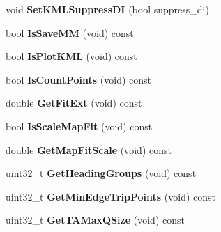 \begin{DoxyCompactItemize}
\item 
void {\bfseries Set\+K\+M\+L\+Suppress\+DI} (bool suppress\+\_\+di)\hypertarget{classconfig_1_1Config_aa4e6f2f9778ba96c67c061aca546a6d0}{}\label{classconfig_1_1Config_aa4e6f2f9778ba96c67c061aca546a6d0}

\item 
bool {\bfseries Is\+Save\+MM} (void) const \hypertarget{classconfig_1_1Config_a0c711135102e48e4b772d14514f03c06}{}\label{classconfig_1_1Config_a0c711135102e48e4b772d14514f03c06}

\item 
bool {\bfseries Is\+Plot\+K\+ML} (void) const \hypertarget{classconfig_1_1Config_a888cd5570140cbaefd290cbc2c49382a}{}\label{classconfig_1_1Config_a888cd5570140cbaefd290cbc2c49382a}

\item 
bool {\bfseries Is\+Count\+Points} (void) const \hypertarget{classconfig_1_1Config_a4a132b365c714bfd649fce0ad7371375}{}\label{classconfig_1_1Config_a4a132b365c714bfd649fce0ad7371375}

\item 
double {\bfseries Get\+Fit\+Ext} (void) const \hypertarget{classconfig_1_1Config_a94f0f1bb98cafd74fb7cd47053060b46}{}\label{classconfig_1_1Config_a94f0f1bb98cafd74fb7cd47053060b46}

\item 
bool {\bfseries Is\+Scale\+Map\+Fit} (void) const \hypertarget{classconfig_1_1Config_a4bca0cce689038144206de65fa184f65}{}\label{classconfig_1_1Config_a4bca0cce689038144206de65fa184f65}

\item 
double {\bfseries Get\+Map\+Fit\+Scale} (void) const \hypertarget{classconfig_1_1Config_a9485edf0a644bd61a58f985c7d5cdb7f}{}\label{classconfig_1_1Config_a9485edf0a644bd61a58f985c7d5cdb7f}

\item 
uint32\+\_\+t {\bfseries Get\+Heading\+Groups} (void) const \hypertarget{classconfig_1_1Config_ad15fed63cef7d7298cf1045900e97c9e}{}\label{classconfig_1_1Config_ad15fed63cef7d7298cf1045900e97c9e}

\item 
uint32\+\_\+t {\bfseries Get\+Min\+Edge\+Trip\+Points} (void) const \hypertarget{classconfig_1_1Config_a2ec480a97b339e0931c1499a94130cd2}{}\label{classconfig_1_1Config_a2ec480a97b339e0931c1499a94130cd2}

\item 
uint32\+\_\+t {\bfseries Get\+T\+A\+Max\+Q\+Size} (void) const \hypertarget{classconfig_1_1Config_aeaf0c63fe7adb3090691c1cfc3b2c1f7}{}\label{classconfig_1_1Config_aeaf0c63fe7adb3090691c1cfc3b2c1f7}


\end{DoxyCompactItemize}
